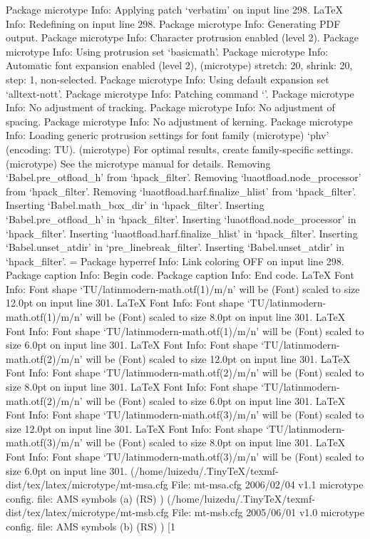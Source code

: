 Package microtype Info: Applying patch `verbatim' on input line 298.
LaTeX Info: Redefining \microtypesetup on input line 298.
Package microtype Info: Generating PDF output.
Package microtype Info: Character protrusion enabled (level 2).
Package microtype Info: Using protrusion set `basicmath'.
Package microtype Info: Automatic font expansion enabled (level 2),
(microtype)             stretch: 20, shrink: 20, step: 1, non-selected.
Package microtype Info: Using default expansion set `alltext-nott'.
Package microtype Info: Patching command `\showhyphens'.
Package microtype Info: No adjustment of tracking.
Package microtype Info: No adjustment of spacing.
Package microtype Info: No adjustment of kerning.
Package microtype Info: Loading generic protrusion settings for font family
(microtype)             `phv' (encoding: TU).
(microtype)             For optimal results, create family-specific settings.
(microtype)             See the microtype manual for details.
Removing  `Babel.pre_otfload_h' from `hpack_filter'.
Removing  `luaotfload.node_processor' from `hpack_filter'.
Removing  `luaotfload.harf.finalize_hlist' from `hpack_filter'.
Inserting `Babel.math_box_dir' in `hpack_filter'.
Inserting `Babel.pre_otfload_h' in `hpack_filter'.
Inserting `luaotfload.node_processor' in `hpack_filter'.
Inserting `luaotfload.harf.finalize_hlist' in `hpack_filter'.
Inserting `Babel.unset_atdir' in `pre_linebreak_filter'.
Inserting `Babel.unset_atdir' in `hpack_filter'.
\c@lstlisting=
Package hyperref Info: Link coloring OFF on input line 298.
Package caption Info: Begin \AtBeginDocument code.
Package caption Info: End \AtBeginDocument code.
LaTeX Font Info:    Font shape `TU/latinmodern-math.otf(1)/m/n' will be
(Font)              scaled to size 12.0pt on input line 301.
LaTeX Font Info:    Font shape `TU/latinmodern-math.otf(1)/m/n' will be
(Font)              scaled to size 8.0pt on input line 301.
LaTeX Font Info:    Font shape `TU/latinmodern-math.otf(1)/m/n' will be
(Font)              scaled to size 6.0pt on input line 301.
LaTeX Font Info:    Font shape `TU/latinmodern-math.otf(2)/m/n' will be
(Font)              scaled to size 12.0pt on input line 301.
LaTeX Font Info:    Font shape `TU/latinmodern-math.otf(2)/m/n' will be
(Font)              scaled to size 8.0pt on input line 301.
LaTeX Font Info:    Font shape `TU/latinmodern-math.otf(2)/m/n' will be
(Font)              scaled to size 6.0pt on input line 301.
LaTeX Font Info:    Font shape `TU/latinmodern-math.otf(3)/m/n' will be
(Font)              scaled to size 12.0pt on input line 301.
LaTeX Font Info:    Font shape `TU/latinmodern-math.otf(3)/m/n' will be
(Font)              scaled to size 8.0pt on input line 301.
LaTeX Font Info:    Font shape `TU/latinmodern-math.otf(3)/m/n' will be
(Font)              scaled to size 6.0pt on input line 301.
(/home/luizedu/.TinyTeX/texmf-dist/tex/latex/microtype/mt-msa.cfg
File: mt-msa.cfg 2006/02/04 v1.1 microtype config. file: AMS symbols (a) (RS)
) (/home/luizedu/.TinyTeX/texmf-dist/tex/latex/microtype/mt-msb.cfg
File: mt-msb.cfg 2005/06/01 v1.0 microtype config. file: AMS symbols (b) (RS)
) [1



